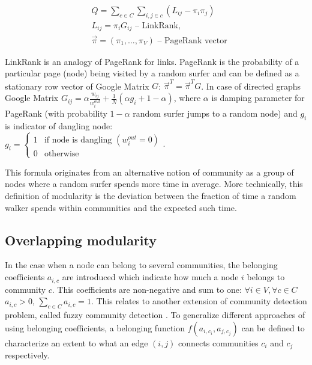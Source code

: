 \documentclass[a4paper,twocolumn]{article}
\begin{document}
\begin{equation}
\label{modularity_linkrank}
\begin{aligned}
& Q=\sum_{c \in C}\sum_{i,j \in c}(L_{ij}-\pi _i \pi _j)
\\
& L_{ij}=\pi _iG_{ij} \text{ -- LinkRank},
\\
& \vec \pi = (\pi_1, \dots, \pi_V) \text{ -- PageRank vector}
\end{aligned}
\end{equation}

LinkRank is an analogy of PageRank \cite{langville2011google} for links. PageRank is the probability of a particular page (node) being visited by a random surfer and can be defined as a stationary row vector of Google Matrix $G$: $\vec \pi^T=\vec \pi^TG$. In case of directed graphs Google Matrix $G_{ij}=\alpha \frac{w_{ij}}{w_i^{out}}+\frac{1}{N} (\alpha g_i+1-\alpha)$, where $\alpha$ is damping parameter for PageRank (with probability $1-\alpha$ random surfer jumps to a random node) and $g_i$ is indicator of dangling node:\\ $g_i=\begin{cases} 1 & \text{if node is dangling } (w_i^{out}=0) \\ 0 & \text{otherwise} \end{cases}$.

This formula originates from an alternative notion of community as a group of nodes where a random surfer spends more time in average. More technically, this definition of modularity is the deviation between the fraction of time a random walker spends within communities and the expected such time.


\subsection{Overlapping modularity}

In the case when a node can belong to several communities, the belonging coefficients $a_{i,c}$ are introduced \cite{Nepusz2007} which indicate how much a node $i$ belongs to community $c$. This coefficients are non-negative and sum to one: $\forall i \in V, \forall c \in C$ $a_{i,c} > 0 $, $\sum_{c \in C}{a_{i,c}}=1$. This relates to another extension of community detection problem, called fuzzy community detection \cite{gregory2011fuzzy}. To generalize different approaches of using belonging coefficients, a belonging function $f(a_{i,c_i},a_{j,c_j})$ can be defined \cite{Chen2015} to characterize an extent to what an edge $(i,j)$ connects communities $c_i$ and $c_j$ respectively.
\end{document}

